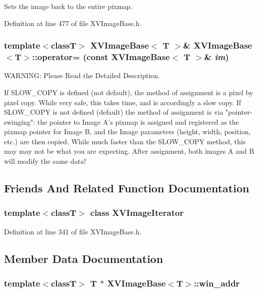 Sets the image back to the entire pixmap.



Definition at line 477 of file XVImage\-Base.h.\label{XVImageBase_a25}
\hypertarget{class_XVImageBase_a25}{
\subsubsection[operator=]{\setlength{\rightskip}{0pt plus 5cm}template$<$classT$>$ XVImage\-Base$<$ T $>$\& XVImage\-Base$<$T$>$::operator= (const XVImage\-Base$<$ T $>$\& {\em im})}}


WARNING: Please Read the Detailed Description.

If SLOW\_\-COPY is defined (not default), the method of assignment is a pixel by pixel copy. While very safe, this takes time, and is accordingly a slow copy. If SLOW\_\-COPY is not defined (default) the method of assignment is via "pointer-swinging": the pointer to  Image A's pixmap is assigned and registered as the pixmap pointer  for Image B, and the Image parameters (height, width, position, etc.) are then copied. While much faster than the SLOW\_\-COPY method, this may may not be what you are expecting. After assignment, both images A and B will modify the same data! 

\subsection{Friends And Related Function Documentation}
\label{XVImageBase_l0}
\hypertarget{class_XVImageBase_l0}{
\subsubsection[XVImageIterator< T >]{\setlength{\rightskip}{0pt plus 5cm}template$<$classT$>$ class XVImage\-Iterator}}




Definition at line 341 of file XVImage\-Base.h.

\subsection{Member Data Documentation}
\label{XVImageBase_n0}
\hypertarget{class_XVImageBase_n0}{
\subsubsection[win_addr]{\setlength{\rightskip}{0pt plus 5cm}template$<$classT$>$ T $\ast$ XVImage\-Base$<$T$>$::win\_\-addr}}


